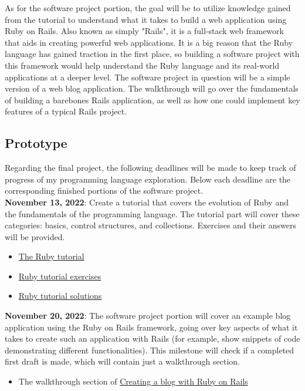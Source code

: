 \documentclass{article}
\theoremstyle{theorem}
\theoremstyle{definition}
\theoremstyle{remark}
\begin{document}
As for the software project portion, the goal will be to utilize knowledge gained from the tutorial to understand what it takes to build a web application using Ruby on Rails. Also known as simply "Rails", it is a full-stack web framework that aids in creating powerful web applications. It is a big reason that the Ruby language has gained traction in the first place, so building a software project with this framework would help understand the Ruby language and its real-world applications at a deeper level. The software project in question will be a simple version of a web blog application. The walkthrough will go over the fundamentals of building a barebones Rails application, as well as how one could implement key features of a typical Rails project.



\subsection{Prototype}
Regarding the final project, the following deadlines will be made to keep track of progress of my programming language exploration. Below each deadline are the corresponding finished portions of the software project.\\

\noindent \textbf{November 13, 2022}: Create a tutorial that covers the evolution of Ruby and the fundamentals of the programming language. The tutorial part will cover these categories: basics, control structures, and collections. Exercises and their answers will be provided.
\begin{itemize}
    \item \href{https://hackmd.io/@evrahnos/HJZPgUjSi}{The Ruby tutorial}
    \item \href{https://hackmd.io/@evrahnos/SkWAtPoBs}{Ruby tutorial exercises}
    \item \href{https://hackmd.io/@evrahnos/S1oUsvoBs}{Ruby tutorial solutions}
\end{itemize}

\noindent \textbf{November 20, 2022}: The software project portion will cover an example blog application using the Ruby on Rails framework, going over key aspects of what it takes to create such an application with Rails (for example, show snippets of code demonstrating different functionalities). This milestone will check if a completed first draft is made, which will contain just a walkthrough section.
\begin{itemize}
    \item The walkthrough section of \href{https://hackmd.io/@evrahnos/ryTuitp8o}{Creating a blog with Ruby on Rails}
\end{itemize}
\end{document}
